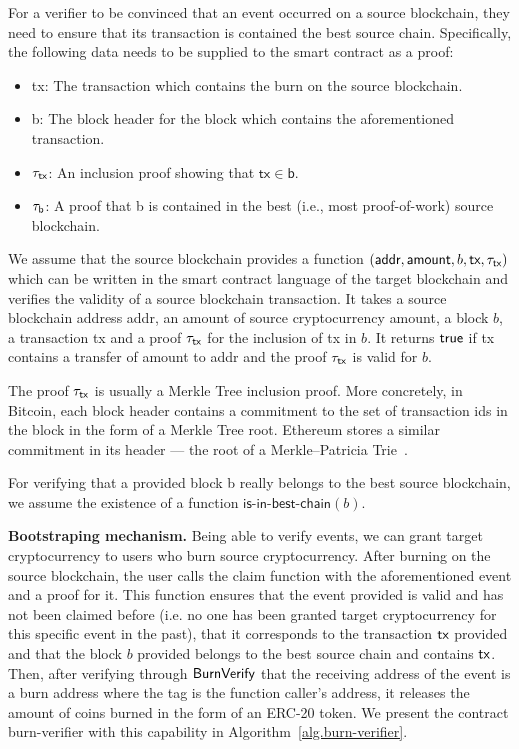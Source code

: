 For a verifier to be convinced that an event occurred on a source blockchain, they need to ensure that its transaction is contained the best source chain. Specifically, the following data needs to be supplied to the smart contract as a proof:

\begin{itemize}
  \item \textsf{tx}: The transaction which contains the burn on the source blockchain.
  \item \textsf{b}: The block header for the block which contains the aforementioned transaction.
  \item $\tau_\textsf{tx}$: An inclusion proof showing that $\mathsf{tx} \in \mathsf{b}$.
  \item $\tau_\textsf{b}$: A proof that \textsf{b} is contained in the best (i.e., most proof-of-work) source blockchain.
\end{itemize}

We assume that the source blockchain provides a function \verifytx$(\textsf{addr}, \textsf{amount}, b, \textsf{tx}, \tau_\textsf{tx})$ which can be written in the smart contract language of the target blockchain and verifies the validity of a source blockchain transaction. It takes a source blockchain address \textsf{addr}, an amount of source cryptocurrency \textsf{amount}, a block $b$, a transaction \textsf{tx} and a proof $\tau_\textsf{tx}$ for the inclusion of \textsf{tx} in $b$. It returns $\mathsf{true}$ if \textsf{tx} contains a transfer of \textsf{amount} to \textsf{addr} and the proof $\tau_\textsf{tx}$ is valid for $b$.

The proof $\tau_\textsf{tx}$ is usually a Merkle Tree inclusion proof. More concretely, in Bitcoin, each block header contains a commitment to the set of transaction ids in the block in the form of a Merkle Tree root. Ethereum stores a similar commitment in its header --- the root of a Merkle--Patricia Trie~\cite{wood2014ethereum}.

For verifying that a provided block \textsf{b} really belongs to the best source blockchain, we assume the existence of a function $\textsf{is-in-best-chain}(b)$.

\noindent
\textbf{Bootstraping mechanism.}
Being able to verify events, we can grant target cryptocurrency to users who burn source cryptocurrency. After burning on the source blockchain, the user calls the \textsf{claim} function with the aforementioned event and a proof for it. This function ensures that the event provided is valid and has not been claimed before (i.e. no one has been granted target cryptocurrency for this specific event in the past), that it corresponds to the transaction $\textsf{tx}$ provided and that the block $b$ provided belongs to the best source chain and contains $\textsf{tx}$. Then, after verifying through $\mathsf{BurnVerify}$ that the receiving address of the event is a burn address where the tag is the function caller's address, it releases the amount of coins burned in the form of an ERC-20 token. We present the contract \textsf{burn-verifier} with this capability in Algorithm~\ref{alg.burn-verifier}.

